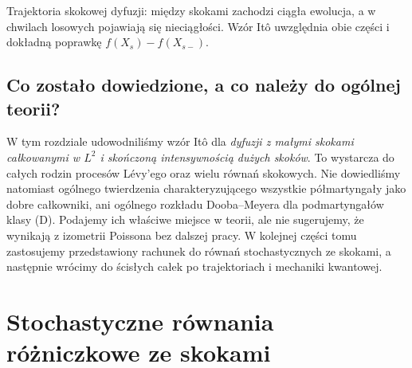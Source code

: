 \documentclass[11pt,a4paper,oneside]{report}
\numberwithin{equation}{chapter}
\theoremstyle{plain}
\theoremstyle{definition}
\theoremstyle{remark}
\begin{document}
\begin{center}
\par\smallskip\small Trajektoria skokowej dyfuzji:
między skokami zachodzi ciągła ewolucja, a w chwilach
losowych pojawiają się nieciągłości. Wzór Itô uwzględnia
obie części i dokładną poprawkę $f(X_s)-f(X_{s-})$.
\end{center}

\section{Co zostało dowiedzione, a co należy do ogólnej teorii?}\label{sec:volIII:12:08}

W tym rozdziale udowodniliśmy wzór Itô dla
\emph{dyfuzji z małymi skokami całkowanymi w $L^2$
i skończoną intensywnością dużych skoków}.
To wystarcza do całych rodzin procesów Lévy'ego oraz
wielu równań skokowych. Nie dowiedliśmy natomiast
ogólnego twierdzenia charakteryzującego wszystkie
półmartyngały jako dobre całkowniki, ani ogólnego
rozkładu Dooba--Meyera dla podmartyngałów klasy (D).
Podajemy ich właściwe miejsce w teorii, ale nie sugerujemy,
że wynikają z izometrii Poissona bez dalszej pracy.
W kolejnej części tomu zastosujemy przedstawiony rachunek
do równań stochastycznych ze skokami, a następnie wrócimy
do ścisłych całek po trajektoriach i mechaniki kwantowej.

\chapter{Stochastyczne równania różniczkowe ze skokami}
\label{chap:volIII:13}
\par\smallskip{}\par\smallskip
\end{document}
